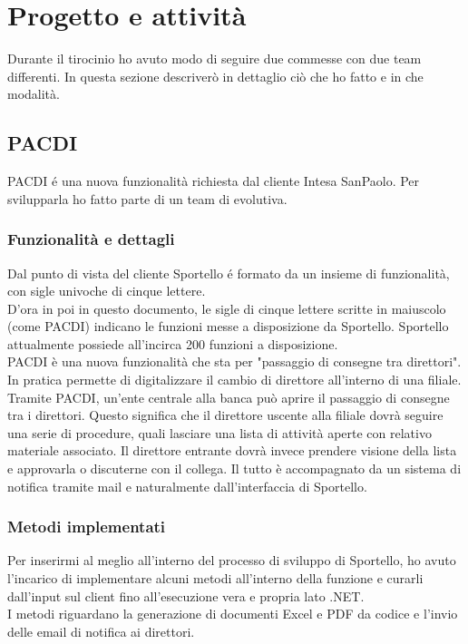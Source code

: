 \section{Progetto e attività}

Durante il tirocinio ho avuto modo di seguire due commesse con due team differenti. In questa sezione descriverò in dettaglio ciò che ho fatto e in che modalità.

\subsection{PACDI}

PACDI é una nuova funzionalità richiesta dal cliente Intesa SanPaolo. Per svilupparla ho fatto parte di un team di evolutiva. 

\subsubsection{Funzionalità e dettagli}

Dal punto di vista del cliente Sportello é formato da un insieme di funzionalità, con sigle univoche di cinque lettere.\\
D'ora in poi in questo documento, le sigle di cinque lettere scritte in maiuscolo (come PACDI) indicano le funzioni messe a disposizione da Sportello. Sportello attualmente possiede all'incirca 200 funzioni a disposizione. \\
PACDI è una nuova funzionalità che sta per "passaggio di consegne tra direttori". In pratica permette di digitalizzare il cambio di direttore all'interno di una filiale. Tramite PACDI, un'ente centrale alla banca può aprire il passaggio di consegne tra i direttori. Questo significa che il direttore uscente alla filiale dovrà seguire una serie di procedure, quali lasciare una lista di attività aperte con relativo materiale associato. Il direttore entrante dovrà invece prendere visione della lista e approvarla o discuterne con il collega. Il tutto è accompagnato da un sistema di notifica tramite mail e naturalmente dall'interfaccia di Sportello. \\

\subsubsection{Metodi implementati}

Per inserirmi al meglio all'interno del processo di sviluppo di Sportello, ho avuto l'incarico di implementare alcuni metodi all'interno della funzione e curarli dall'input sul client fino all'esecuzione vera e propria lato .NET. \\ 
I metodi riguardano la generazione di documenti Excel e PDF da codice e l'invio delle email di notifica ai direttori.

